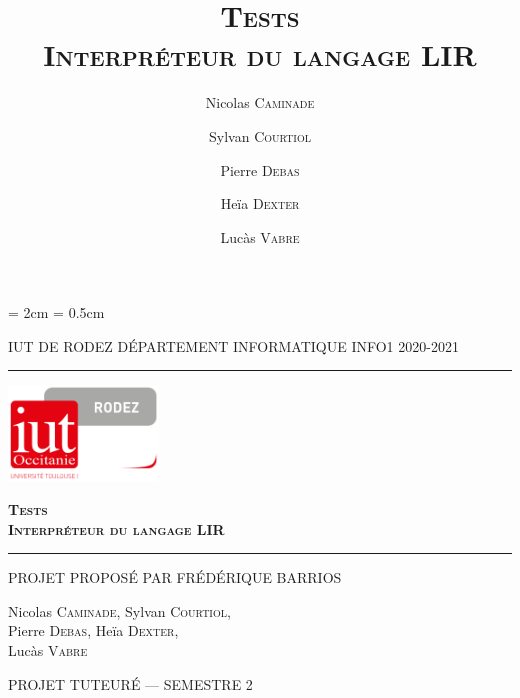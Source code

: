 \pagestyle{fancy}

\title{\textsc{\textbf{Tests
            \\Interpréteur du langage LIR}}}
\date{}
\author{Nicolas \textsc{Caminade} \and Sylvan \textsc{Courtiol} \and
    Pierre \textsc{Debas} \and Heïa \textsc{Dexter} \and Lucàs
    \textsc{Vabre} }
%
\lhead{\leftmark}

\cfoot{\thepage}
\headheight = 2cm
\headsep = 0.5cm

\begin{titlepage}
    \selectfont

    \begin{center}\normalsize
        \MakeUppercase{IUT de Rodez \hfill Département informatique
            \hfill INFO1 2020-2021}
    \end{center}
    \vspace*{0.1cm}
    \hrule
    \vspace*{0.2cm}
    \begin{flushright}
        \includegraphics[width=4cm]{./img/logoiut}
    \end{flushright}
    \vspace*{2cm}
    \begin{flushright}\Huge
        \textsc{\textbf{Tests
                \\Interpréteur du langage LIR}}
    \end{flushright}
    \hrule
    \begin{flushleft}
        \MakeUppercase{Projet proposé par Frédérique Barrios}
    \end{flushleft}
    \vspace*{2cm}
    \begin{center}\Large
        Nicolas \textsc{Caminade}, Sylvan \textsc{Courtiol},\\
        Pierre \textsc{Debas}, Heïa \textsc{Dexter}, \\
        Lucàs \textsc{Vabre}
    \end{center}
    \vfill
    \begin{center}\normalsize
        \MakeUppercase{Projet tuteuré --- Semestre 2}
    \end{center}
\end{titlepage}

